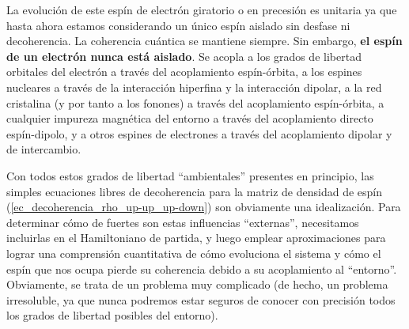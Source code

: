 \documentclass[a4paper,11pt]{book} %
\numberwithin{equation}{chapter}
\begin{document}
La evolución de este espín de electrón giratorio o en precesión es unitaria ya que hasta ahora estamos considerando un único espín aislado sin desfase ni decoherencia. La coherencia cuántica se mantiene siempre. Sin embargo, \textbf{el espín de un electrón nunca está aislado}. Se acopla a los grados de libertad orbitales del electrón a través del acoplamiento espín-órbita, a los espines nucleares a través de la interacción hiperfina y la interacción dipolar, a la red cristalina (y por tanto a los fonones) a través del acoplamiento espín-órbita, a cualquier impureza magnética del entorno a través del acoplamiento directo espín-dipolo, y a otros espines de electrones a través del acoplamiento dipolar y de intercambio. 

Con todos estos grados de libertad ``ambientales'' presentes en principio, las simples ecuaciones libres de decoherencia para la matriz de densidad de espín (\ref{ec_decoherencia_rho_up-up_up-down}) son obviamente una idealización. Para determinar cómo de fuertes son estas influencias ``externas'', necesitamos incluirlas en el Hamiltoniano de partida, y luego emplear aproximaciones para lograr una comprensión cuantitativa de cómo evoluciona el sistema y cómo el espín que nos ocupa pierde su coherencia debido a su acoplamiento al ``entorno''. Obviamente, se trata de un problema muy complicado (de hecho, un problema irresoluble, ya que nunca podremos estar seguros de conocer con precisión todos los grados de libertad posibles del entorno). 
\end{document}
